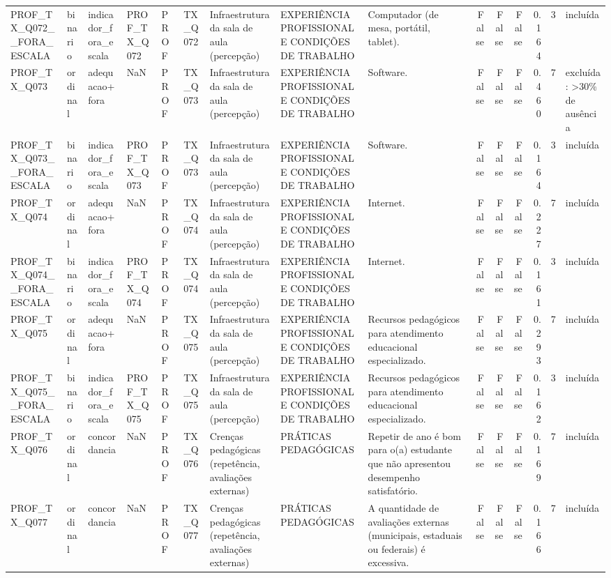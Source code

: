\begin{tabular}{lllllllllrrrrrl}
PROF\_TX\_Q072\_\_FORA\_ESCALA & binario & indicador\_fora\_escala & PROF\_TX\_Q072 & PROF & TX\_Q072 & Infraestrutura da sala de aula (percepção) & EXPERIÊNCIA PROFISSIONAL E CONDIÇÕES DE TRABALHO & Computador (de mesa, portátil, tablet). & False & False & False & 0.164 & 3 & incluída \\
PROF\_TX\_Q073 & ordinal & adequacao+fora & NaN & PROF & TX\_Q073 & Infraestrutura da sala de aula (percepção) & EXPERIÊNCIA PROFISSIONAL E CONDIÇÕES DE TRABALHO & Software. & False & False & False & 0.460 & 7 & excluída: >30\% de ausência \\
PROF\_TX\_Q073\_\_FORA\_ESCALA & binario & indicador\_fora\_escala & PROF\_TX\_Q073 & PROF & TX\_Q073 & Infraestrutura da sala de aula (percepção) & EXPERIÊNCIA PROFISSIONAL E CONDIÇÕES DE TRABALHO & Software. & False & False & False & 0.164 & 3 & incluída \\
PROF\_TX\_Q074 & ordinal & adequacao+fora & NaN & PROF & TX\_Q074 & Infraestrutura da sala de aula (percepção) & EXPERIÊNCIA PROFISSIONAL E CONDIÇÕES DE TRABALHO & Internet. & False & False & False & 0.227 & 7 & incluída \\
PROF\_TX\_Q074\_\_FORA\_ESCALA & binario & indicador\_fora\_escala & PROF\_TX\_Q074 & PROF & TX\_Q074 & Infraestrutura da sala de aula (percepção) & EXPERIÊNCIA PROFISSIONAL E CONDIÇÕES DE TRABALHO & Internet. & False & False & False & 0.161 & 3 & incluída \\
PROF\_TX\_Q075 & ordinal & adequacao+fora & NaN & PROF & TX\_Q075 & Infraestrutura da sala de aula (percepção) & EXPERIÊNCIA PROFISSIONAL E CONDIÇÕES DE TRABALHO & Recursos pedagógicos para atendimento educacional especializado. & False & False & False & 0.293 & 7 & incluída \\
PROF\_TX\_Q075\_\_FORA\_ESCALA & binario & indicador\_fora\_escala & PROF\_TX\_Q075 & PROF & TX\_Q075 & Infraestrutura da sala de aula (percepção) & EXPERIÊNCIA PROFISSIONAL E CONDIÇÕES DE TRABALHO & Recursos pedagógicos para atendimento educacional especializado. & False & False & False & 0.162 & 3 & incluída \\
PROF\_TX\_Q076 & ordinal & concordancia & NaN & PROF & TX\_Q076 & Crenças pedagógicas (repetência, avaliações externas) & PRÁTICAS PEDAGÓGICAS & Repetir de ano é bom para o(a) estudante que não apresentou desempenho satisfatório. & False & False & False & 0.169 & 7 & incluída \\
PROF\_TX\_Q077 & ordinal & concordancia & NaN & PROF & TX\_Q077 & Crenças pedagógicas (repetência, avaliações externas) & PRÁTICAS PEDAGÓGICAS & A quantidade de avaliações externas (municipais, estaduais ou federais) é excessiva. & False & False & False & 0.166 & 7 & incluída \\

\end{tabular}
